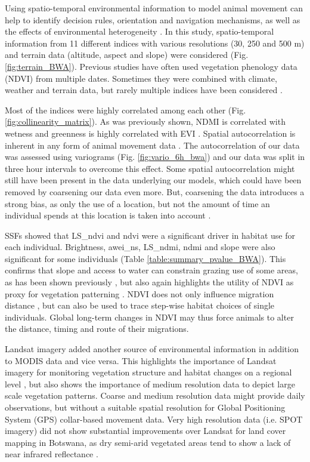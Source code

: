 \documentclass[12pt,a4paper, twoside, english]{article}
\begin{document}
Using spatio-temporal environmental information to model animal movement can help to identify decision rules, orientation and navigation mechanisms, as well as the effects of environmental heterogeneity \citep{Bartlam-Brooks2013}. In this study, spatio-temporal information from 11 different indices with various resolutions (30, 250 and 500 m) and terrain data (altitude, aspect and slope) were considered (Fig. \ref{fig:terrain_BWA}). Previous studies have often used vegetation phenology data (NDVI) from multiple dates. Sometimes they were combined with climate, weather and terrain data, but rarely multiple indices have been considered \citep{Neumann2015a}.

Most of the indices were highly correlated among each other (Fig. \ref{fig:collinearity_matrix}). As was previously shown, NDMI is correlated with wetness \citep{Jin2005} and greenness is highly correlated with EVI \citep{Zhang2002}.
Spatial autocorrelation is inherent in any form of animal movement data \citep{Fleming2015a}. The autocorrelation of our data was assessed using variograms (Fig. \ref{fig:vario_6h_bwa}) and our data was split in three hour intervals to overcome this effect. Some spatial autocorrelation might still have been present in the data underlying our models, which could have been removed by coarsening our data even more. But, coarsening the data introduces a strong bias, as only the use of a location, but not the amount of time an individual spends at this location is taken into account \citep{Lele2013}.

SSFs showed that LS\_ndvi and ndvi were a significant driver in habitat use for each individual. Brightness, awei\_ns, LS\_ndmi, ndmi and slope were also significant for some individuals (Table \ref{table:summary_pvalue_BWA}). This confirms that slope and access to water can constrain grazing use of some areas, as has been shown previously \citep{Bailey1996a}, but also again highlights the utility of NDVI as proxy for vegetation patterning \citep{Pettorelli2011}. NDVI does not only influence migration distance \citep{Teitelbaum2015}, but can also be used to trace step-wise habitat choices of single individuals. Global long-term changes in NDVI may thus force animals to alter the distance, timing and route of their migrations. 

Landsat imagery added another source of environmental information in addition to MODIS data and vice versa. This highlights the importance of Landsat imagery for monitoring vegetation structure and habitat changes on a regional level \citep{Nagendra2013, Willis2015}, but also shows the importance of medium resolution data to depict large scale vegetation patterns. Coarse and medium resolution data might provide daily observations, but without a suitable spatial resolution for Global Positioning System (GPS) collar-based movement data. Very high resolution data (i.e. SPOT imagery) did not show substantial improvements over Landsat for land cover mapping in Botswana, as dry semi-arid vegetated areas tend to show a lack of near infrared reflectance \citep{Kgathi2014}.
\end{document}
